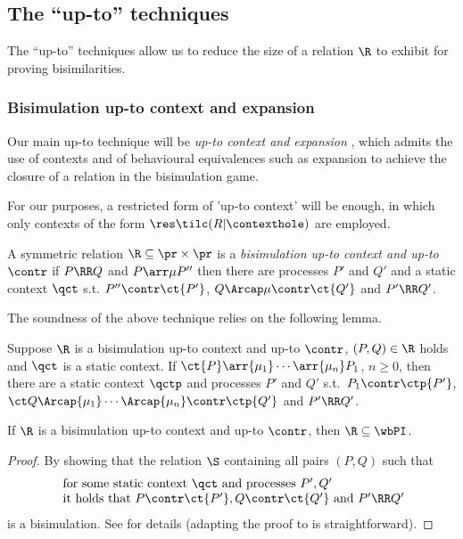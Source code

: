 \subsection{The ``up-to'' techniques}
\label{ss:upto}
The ``up-to'' techniques allow us to reduce
the size of a relation $\R$ to exhibit for proving bisimilarities.

\subsubsection{Bisimulation up-to context and expansion}

Our main up-to technique will be
{\em up-to context and expansion} \cite{San93c},
which admits the use of contexts and of behavioural equivalences such as 
expansion to achieve the
closure of a relation in the bisimulation game.

For our purposes, a restricted form of 'up-to context' will be enough,
in which only contexts of the form $\res \tilc (R   |  \contexthole)$ are
employed.


\begin{definition}
  \label{d:uptp_sce}
  A symmetric relation $  \R   \subseteq \pr \times \pr $ is a 
  {\em bisimulation up-to context and up-to $\contr$ }
  if $P \RR Q$ and 
  $P \arr\mu P''$
  then there are processes  $P'$ and $Q'$ 
  and a static context $\qct$
  s.t. $ P'' \contr \ct {P'}$, 
  $Q \Arcap\mu  \contr \ct{Q'}$ and 
  $P'  \RR  Q'$.
\end{definition}


The soundness of the above technique relies on the following lemma.
\begin{lemma}
\label{l:uptocon-expa}
Suppose $ \R $ is a bisimulation up-to context and up-to $\contr$,
 $(P, Q) \in  \R $ holds and  $\qct$ is a 
 static context. 
If  $\ct{P}\arr{\mu_1} \cdots\arr{\mu_n}  P_1$, $n\geq 0$,
 then
there are a static context $\qctp$ and processes $P'$ and $Q'$
s.t.\  $P_1 \contr \ctp{P'}$, $\ct Q \Arcap{\mu_1} \cdots
\Arcap{\mu_n} \contr \ctp{Q'}$ and $P'  \RR  Q'$. 
\end{lemma} 

\begin{theorem}
\label{t:up-to-con-expa}
If $ \R  $  is a 
bisimulation up-to context and up-to $\contr$, then $ \R  \subseteq \wbPI$.
\end{theorem} 
 
\begin{proof}
By showing that  
the relation $\S$ containing 
all pairs $(P,Q)$ such that 
\[ \begin{array}{l}
 \mbox{ for some static context $\qct$ and
processes $P', Q'$} \\
 \mbox{ it holds that } P \contr \ct{P'}, Q \contr \ct{Q'} \mbox{ and }
P'  \RR  Q' %
 \end{array}
 \]
is a bisimulation. 
See \cite{San93c} for details (adapting the proof to \Intp is
straightforward).
\end{proof}

